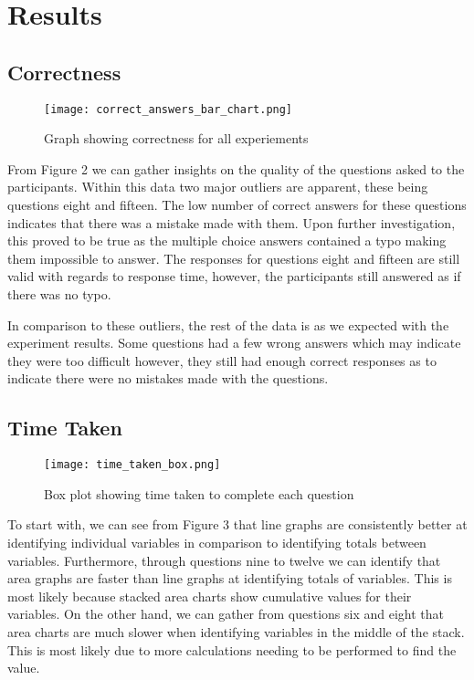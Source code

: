 \section{Results}
\subsection*{Correctness}
\begin{figure}[H]
    \centering
    \texttt{[image: correct\_answers\_bar\_chart.png]}
    \caption{Graph showing correctness for all experiements}
\end{figure}
\begin{flushleft}
    \quad From Figure 2 we can gather insights on the quality of the questions asked to the participants.
    Within this data two major outliers are apparent, these being questions eight and fifteen. The low number of 
    correct answers for these questions indicates that there was a mistake made with them. Upon further investigation,
    this proved to be true as the multiple choice answers contained a typo making them impossible to answer. The responses for questions eight and fifteen 
    are still valid with regards to response time, however, the participants still answered as if there was no typo.

    \quad In comparison to these outliers, the rest of the data is as we expected with the experiment results. Some questions had a few wrong answers which may indicate they were too difficult
    however, they still had enough correct responses as to indicate there were no mistakes made with the questions.
\end{flushleft}

\subsection*{Time Taken}
\begin{figure}[H]
    \centering
    \texttt{[image: time\_taken\_box.png]}
    \caption{Box plot showing time taken to complete each question}
\end{figure}
\begin{flushleft}
    \quad To start with, we can see from Figure 3 that line graphs are consistently better at identifying individual variables in comparison to identifying totals between variables.
    Furthermore, through questions nine to twelve we can identify that area graphs are faster than line graphs at identifying totals of variables. This is most likely because stacked 
    area charts show cumulative values for their variables. On the other hand, we can gather from questions six and eight that area charts are much slower when identifying variables in the middle of
    the stack. This is most likely due to more calculations needing to be performed to find the value.
\end{flushleft}


